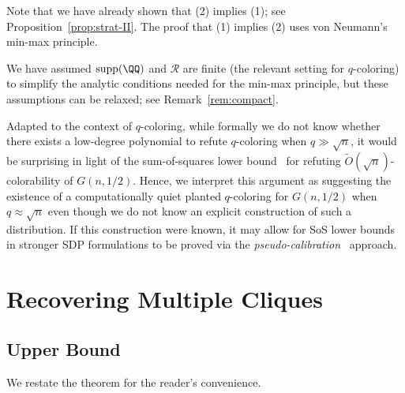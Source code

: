 \documentclass{article}
\begin{document}
\noindent Note that we have already shown that (2) implies (1); see Proposition~\ref{prop:strat-II}. The proof that (1) implies (2) uses von Neumann's min-max principle.

\begin{remark}
We have assumed $\mathrm{supp}(\QQ)$ and $\mathcal{R}$ are finite (the relevant setting for $q$-coloring) to simplify the analytic conditions needed for the min-max principle, but these assumptions can be relaxed; see Remark~\ref{rem:compact}.
\end{remark}

Adapted to the context of $q$-coloring, while formally we do not know whether there exists a low-degree polynomial to refute $q$-coloring when $q \gg \sqrt{n}$, it would be surprising in light of the sum-of-squares lower bound~\cite{KM21} for refuting $\tilde{O}(\sqrt{n})$-colorability of $G(n,1/2)$. Hence, we interpret this argument as suggesting the existence of a computationally quiet planted $q$-coloring for $G(n,1/2)$ when $q \approx \sqrt{n}$ even though we do not know an explicit construction of such a distribution. If this construction were known, it may allow for SoS lower bounds in stronger SDP formulations to be proved via the \emph{pseudo-calibration}~\cite{BHKK+16} approach.





\section{Recovering Multiple Cliques}

\subsection{Upper Bound}

We restate the theorem for the reader's convenience.

\thmrecoveryupper*
\end{document}
